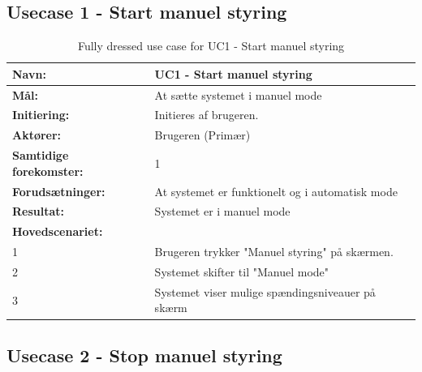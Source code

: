\subsection{Usecase 1 - Start manuel styring}
\begin{table}[H]
	\centering
	
	\begin{threeparttable}
		\begin{tabularx}{\linewidth}{ l X }
			\toprule
			\bfseries{Navn:}				& UC1 - Start manuel styring  \\
			\midrule
			\bfseries{Mål:} 				& At sætte systemet i manuel mode \\
			\midrule
			\bfseries{Initiering:} 			& Initieres af brugeren. \\
			\midrule
			\bfseries{Aktører:} 			& Brugeren (Primær) \\
			\midrule
			\bfseries{Samtidige forekomster:} & 1 \\
			\midrule
			\bfseries{Forudsætninger:} 		& At systemet er funktionelt og i automatisk mode\\
			\midrule
			\bfseries{Resultat:} 			& Systemet er i manuel mode \\
			\midrule
			\bfseries{Hovedscenariet:} 	& \\
			
			
			1 	& Brugeren trykker "Manuel styring" på skærmen.\\
			2	& Systemet skifter til "Manuel mode" \\
			3 	& Systemet viser mulige spændingsniveauer på skærm 	\\
			
			\bottomrule
			
		\end{tabularx}
	\end{threeparttable}
	\caption{Fully dressed use case for UC1 - Start manuel styring}
	\label{table:UC1}
\end{table}

\subsection{Usecase 2 - Stop manuel styring}

